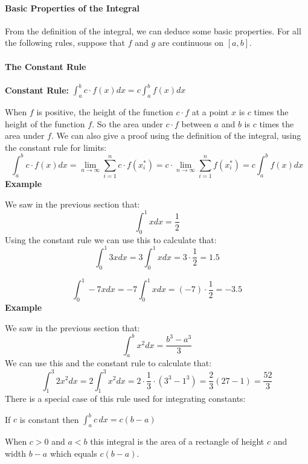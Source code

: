 \paragraph{Basic Properties of the Integral}



From the definition of the integral, we can deduce some basic properties. For all the following rules, suppose that $f$ and $g$ are continuous on $[a,b]$.



\paragraph{The Constant Rule}



\textbf{Constant Rule:} $\int_a^b c \cdot f(x) dx = c \int_a^b f(x) dx$



When $f$ is positive, the height of the function $c \cdot f$ at a point $x$ is $c$ times the height of the function $f$. So the area under $c \cdot f$ between $a$ and $b$ is $c$ times the area under $f$. We can also give a proof using the definition of the integral, using the constant rule for limits:
$$
\int_a^b c \cdot f(x) dx = \lim_{n \to \infty} \sum_{i=1}^n c \cdot f(x_{i}^\ast) = c \cdot \lim_{n \to \infty} \sum_{i=1}^n f(x_{i}^\ast) = c \int_a^b f(x) dx
$$
\textbf{Example}



We saw in the previous section that:
$$
\int_0^1 x dx = \frac{1}{2}
$$
Using the constant rule we can use this to calculate that:
$$
\int_0^1 3x dx = 3 \int_0^1 x dx = 3 \cdot \frac{1}{2} = 1.5
$$



$$
\int_0^1 -7x dx = -7 \int_0^1 x dx = (-7) \cdot \frac{1}{2} = -3.5
$$
\textbf{Example}



We saw in the previous section that:
$$
\int_a^b x^2 dx = \frac{b^3 - a^3}{3}
$$
We can use this and the constant rule to calculate that:
$$
\int_1^3 2x^2 dx = 2 \int_1^3 x^2 dx = 2 \cdot \frac{1}{3} \cdot (3^3 - 1^3) = \frac{2}{3}(27 - 1) = \frac{52}{3}
$$
There is a special case of this rule used for integrating constants:



If $c$ is constant then $\int_a^b c \, dx = c(b-a)$



When $c > 0$ and $a < b$ this integral is the area of a rectangle of height $c$ and width $b-a$ which equals $c(b-a)$.



